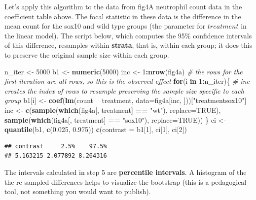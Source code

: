 \documentclass[]{book}
\newenvironment{Shaded}{\begin{snugshade}}{\end{snugshade}}
\newcommand{\KeywordTok}[1]{\textcolor[rgb]{0.13,0.29,0.53}{\textbf{#1}}}
\newcommand{\DataTypeTok}[1]{\textcolor[rgb]{0.13,0.29,0.53}{#1}}
\newcommand{\DecValTok}[1]{\textcolor[rgb]{0.00,0.00,0.81}{#1}}
\newcommand{\FloatTok}[1]{\textcolor[rgb]{0.00,0.00,0.81}{#1}}
\newcommand{\StringTok}[1]{\textcolor[rgb]{0.31,0.60,0.02}{#1}}
\newcommand{\CommentTok}[1]{\textcolor[rgb]{0.56,0.35,0.01}{\textit{#1}}}
\newcommand{\OtherTok}[1]{\textcolor[rgb]{0.56,0.35,0.01}{#1}}
\newcommand{\ControlFlowTok}[1]{\textcolor[rgb]{0.13,0.29,0.53}{\textbf{#1}}}
\newcommand{\OperatorTok}[1]{\textcolor[rgb]{0.81,0.36,0.00}{\textbf{#1}}}
\newcommand{\NormalTok}[1]{#1}
\begin{document}
Let's apply this algorithm to the data from fig4A neutrophil count data
in the coefficient table above. The focal statistic in these data is the
difference in the mean count for the sox10 and wild type groups (the
parameter for \(treatment\) in the linear model). The script below,
which computes the 95\% confidence intervals of this difference,
resamples within \textbf{strata}, that is, within each group; it does
this to preserve the original sample size within each group.

\begin{Shaded}
\begin{Highlighting}[]
\NormalTok{n_iter <-}\StringTok{ }\DecValTok{5000}
\NormalTok{b1 <-}\StringTok{ }\KeywordTok{numeric}\NormalTok{(}\DecValTok{5000}\NormalTok{)}
\NormalTok{inc <-}\StringTok{ }\DecValTok{1}\OperatorTok{:}\KeywordTok{nrow}\NormalTok{(fig4a) }\CommentTok{# the rows for the first iteration are all rows, so this is the observed effect}
\ControlFlowTok{for}\NormalTok{(i }\ControlFlowTok{in} \DecValTok{1}\OperatorTok{:}\NormalTok{n_iter)\{}
  \CommentTok{# inc creates the index of rows to resample preserving the sample size specific to each group}
\NormalTok{  b1[i] <-}\StringTok{ }\KeywordTok{coef}\NormalTok{(}\KeywordTok{lm}\NormalTok{(count }\OperatorTok{~}\StringTok{ }\NormalTok{treatment, }\DataTypeTok{data=}\NormalTok{fig4a[inc, ]))[}\StringTok{"treatmentsox10"}\NormalTok{]}
\NormalTok{  inc <-}\StringTok{ }\KeywordTok{c}\NormalTok{(}\KeywordTok{sample}\NormalTok{(}\KeywordTok{which}\NormalTok{(fig4a[, treatment] }\OperatorTok{==}\StringTok{ "wt"}\NormalTok{), }\DataTypeTok{replace=}\OtherTok{TRUE}\NormalTok{),}
           \KeywordTok{sample}\NormalTok{(}\KeywordTok{which}\NormalTok{(fig4a[, treatment] }\OperatorTok{==}\StringTok{ "sox10"}\NormalTok{), }\DataTypeTok{replace=}\OtherTok{TRUE}\NormalTok{))}
\NormalTok{\}}
\NormalTok{ci <-}\StringTok{ }\KeywordTok{quantile}\NormalTok{(b1, }\KeywordTok{c}\NormalTok{(}\FloatTok{0.025}\NormalTok{, }\FloatTok{0.975}\NormalTok{))}
\KeywordTok{c}\NormalTok{(}\DataTypeTok{contrast =}\NormalTok{ b1[}\DecValTok{1}\NormalTok{], ci[}\DecValTok{1}\NormalTok{], ci[}\DecValTok{2}\NormalTok{])}
\end{Highlighting}
\end{Shaded}

\begin{verbatim}
## contrast     2.5%    97.5% 
## 5.163215 2.077892 8.264316
\end{verbatim}

The intervals calculated in step 5 are \textbf{percentile intervals}. A
histogram of the the re-sampled differences helps to visualize the
bootstrap (this is a pedagogical tool, not something you would want to
publish).
\end{document}
